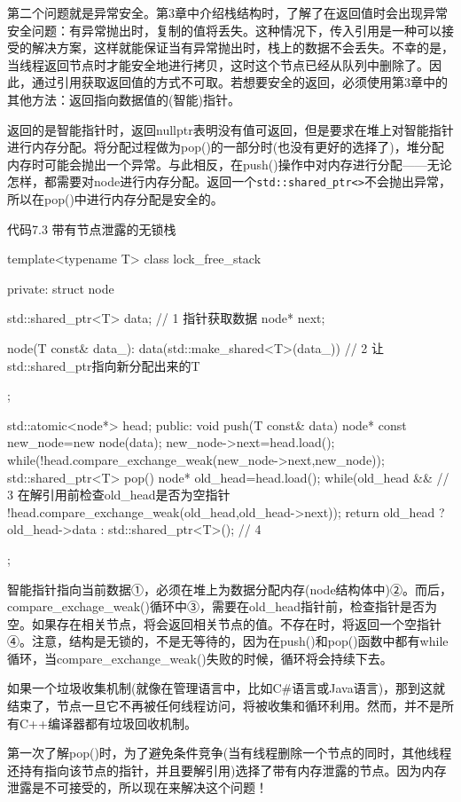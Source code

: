 第二个问题就是异常安全。第3章中介绍栈结构时，了解了在返回值时会出现异常安全问题：有异常抛出时，复制的值将丢失。这种情况下，传入引用是一种可以接受的解决方案，这样就能保证当有异常抛出时，栈上的数据不会丢失。不幸的是， 当线程返回节点时才能安全地进行拷贝，这时这个节点已经从队列中删除了。因此，通过引用获取返回值的方式不可取。若想要安全的返回，必须使用第3章中的其他方法：返回指向数据值的(智能)指针。

返回的是智能指针时，返回nullptr表明没有值可返回，但是要求在堆上对智能指针进行内存分配。将分配过程做为pop()的一部分时(也没有更好的选择了)，堆分配内存时可能会抛出一个异常。与此相反，在push()操作中对内存进行分配——无论怎样，都需要对node进行内存分配。返回一个\texttt{std::shared\_ptr<>}不会抛出异常，所以在pop()中进行内存分配是安全的。

代码7.3 带有节点泄露的无锁栈

\begin{cpp}
template<typename T>
class lock_free_stack
{
private:
  struct node
  {
    std::shared_ptr<T> data;  // 1 指针获取数据
    node* next;

    node(T const& data_):
      data(std::make_shared<T>(data_))  // 2 让std::shared_ptr指向新分配出来的T
    {}
  };

  std::atomic<node*> head;
public:
  void push(T const& data)
  {
    node* const new_node=new node(data);
    new_node->next=head.load();
    while(!head.compare_exchange_weak(new_node->next,new_node));
  }
  std::shared_ptr<T> pop()
  {
    node* old_head=head.load();
    while(old_head && // 3 在解引用前检查old_head是否为空指针
      !head.compare_exchange_weak(old_head,old_head->next));
    return old_head ? old_head->data : std::shared_ptr<T>();  // 4
  }
};
\end{cpp}

智能指针指向当前数据①，必须在堆上为数据分配内存(node结构体中)②。而后，compare\_exchage\_weak()循环中③，需要在old\_head指针前，检查指针是否为空。如果存在相关节点，将会返回相关节点的值。不存在时，将返回一个空指针④。注意，结构是无锁的，不是无等待的，因为在push()和pop()函数中都有while循环，当compare\_exchange\_weak()失败的时候，循环将会持续下去。

如果一个垃圾收集机制(就像在管理语言中，比如C\#语言或Java语言)，那到这就结束了，节点一旦它不再被任何线程访问，将被收集和循环利用。然而，并不是所有C++编译器都有垃圾回收机制。


第一次了解pop()时，为了避免条件竞争(当有线程删除一个节点的同时，其他线程还持有指向该节点的指针，并且要解引用)选择了带有内存泄露的节点。因为内存泄露是不可接受的，所以现在来解决这个问题！

